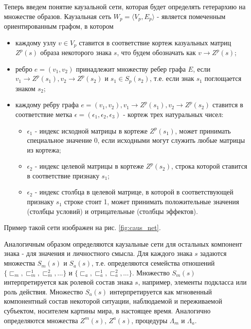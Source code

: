 \documentclass[12pt]{scrartcl}
\begin{document}
	Теперь введем понятие каузальной сети, которая будет определять гетерархию на множестве образов. Каузальная сеть $W_p=\langle V_p, E_p \rangle$ - является помеченным ориентированным графом, в котором
	\begin{itemize}
		\item каждому узлу $v\in V_p$ ставится в соответствие кортеж казуальных матриц $Z^p(s)$ образа некоторого знака $s$, что будем обозначать как $v\rightarrow Z^p(s)$;
		\item ребро $e=(v_1, v_2)$ принадлежит множеству ребер графа $E$, если $v_1\rightarrow Z^p(s_1), v_2\rightarrow Z^p(s_2)$ и $s_1\in S_p(s_2)$, т.е. если знак $s_1$ поглощается знаком $s_2$;
		\item каждому ребру графа $e=(v_1, v_2), v_1\rightarrow Z^p(s_1), v_2\rightarrow Z^p(s_2)$ ставится в соответствие метка $\epsilon=(\epsilon_1,\epsilon_2,\epsilon_3)$ - кортеж трех натуральных чисел:
		\begin{itemize}
			\item $\epsilon_1$ - индекс исходной матрицы в кортеже $Z^p(s_1)$, может принимать специальное значение 0, если исходными могут служить любые матрицы из кортежа;
			\item $\epsilon_2$ - индекс целевой матрицы в кортеже $Z^p(s_2)$, строка которой ставится в соответствие признаку $s_1$;
			\item $\epsilon_2$ - индекс столбца в целевой матрице, в которой в соответствующей признаку $s_1$ строке стоит 1, может принимать положительные значения (столбцы условий) и отрицательные (столбцы эффектов).
		\end{itemize}		
	\end{itemize}
	
	Пример такой сети изображен на рис. \ref{fig:caus_net}.
	
	Аналогичным образом определяются каузальные сети для остальных компонент знака - для значения и личностного смысла. Для каждого знака $s$ задаются множества $S_m(s)$ и $S_a(s)$, т.е. определяются семейства отношений $\{\sqsubset_m,\sqsubset_m^1,\sqsubset_m^2,\dots\}$ и $\{\sqsubset_a,\sqsubset_a^1,\sqsubset_a^2,\dots\}$. Множество $S_m(s)$ интерпретируется как ролевой состав знака $s$, например, элементы подкласса или роль действия. Множество $S_a(s)$ интерпретируется как мгновенный компонентный состав некоторой ситуации, наблюдаемой и переживаемой субъектом, носителем картины мира, в настоящее время. Аналогично определяются множества $Z^m(s)$, $Z^a(s)$, процедуры $\Lambda_m$ и $\Lambda_a$.
	
\end{document}
